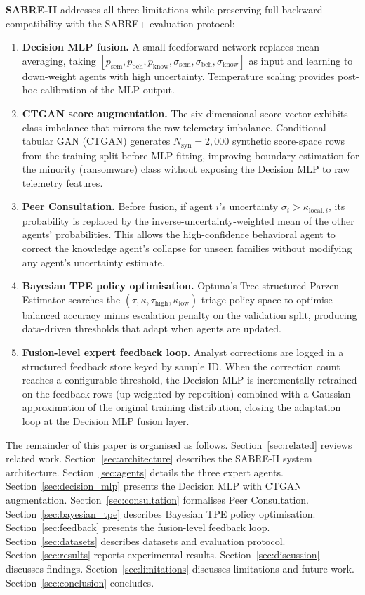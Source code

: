 \documentclass[journal]{IEEEtran}
\newcommand{\sem}{\mathrm{sem}}
\newcommand{\beh}{\mathrm{beh}}
\newcommand{\know}{\mathrm{know}}
\newcommand{\tauh}{\tau_{\mathrm{high}}}
\newcommand{\klow}{\kappa_{\mathrm{low}}}
\newcommand{\Nsynth}{N_{\mathrm{syn}}}
\begin{document}
\textbf{SABRE-II} addresses all three limitations while preserving full
backward compatibility with the SABRE+ evaluation protocol:

\begin{enumerate}
\item \textbf{Decision MLP fusion.}
A small feedforward network replaces mean averaging, taking
$[p_{\sem}, p_{\beh}, p_{\know}, \sigma_{\sem}, \sigma_{\beh}, \sigma_{\know}]$
as input and learning to down-weight agents with high uncertainty.
Temperature scaling provides post-hoc calibration of the MLP output.

\item \textbf{CTGAN score augmentation.}
The six-dimensional score vector exhibits class imbalance that mirrors
the raw telemetry imbalance.
Conditional tabular GAN (CTGAN) \cite{xu_ctgan_2019} generates
$\Nsynth = 2{,}000$ synthetic score-space rows from the training split
before MLP fitting, improving boundary estimation for the minority
(ransomware) class without exposing the Decision MLP to raw telemetry features.

\item \textbf{Peer Consultation.}
Before fusion, if agent $i$'s uncertainty $\sigma_i > \kappa_{\mathrm{local},i}$,
its probability is replaced by the inverse-uncertainty-weighted mean of
the other agents' probabilities.
This allows the high-confidence behavioral agent to correct the
knowledge agent's collapse for unseen families without modifying any
agent's uncertainty estimate.

\item \textbf{Bayesian TPE policy optimisation.}
Optuna's Tree-structured Parzen Estimator searches the
$(\tau, \kappa, \tauh, \klow)$ triage policy space to optimise balanced
accuracy minus escalation penalty on the validation split, producing
data-driven thresholds that adapt when agents are updated.

\item \textbf{Fusion-level expert feedback loop.}
Analyst corrections are logged in a structured feedback store keyed by
sample ID.
When the correction count reaches a configurable threshold, the Decision
MLP is incrementally retrained on the feedback rows (up-weighted by
repetition) combined with a Gaussian approximation of the original
training distribution, closing the adaptation loop at the Decision MLP fusion layer.
\end{enumerate}

The remainder of this paper is organised as follows.
Section~\ref{sec:related} reviews related work.
Section~\ref{sec:architecture} describes the SABRE-II system architecture.
Section~\ref{sec:agents} details the three expert agents.
Section~\ref{sec:decision_mlp} presents the Decision MLP with CTGAN augmentation.
Section~\ref{sec:consultation} formalises Peer Consultation.
Section~\ref{sec:bayesian_tpe} describes Bayesian TPE policy optimisation.
Section~\ref{sec:feedback} presents the fusion-level feedback loop.
Section~\ref{sec:datasets} describes datasets and evaluation protocol.
Section~\ref{sec:results} reports experimental results.
Section~\ref{sec:discussion} discusses findings.
Section~\ref{sec:limitations} discusses limitations and future work.
Section~\ref{sec:conclusion} concludes.
\end{document}
